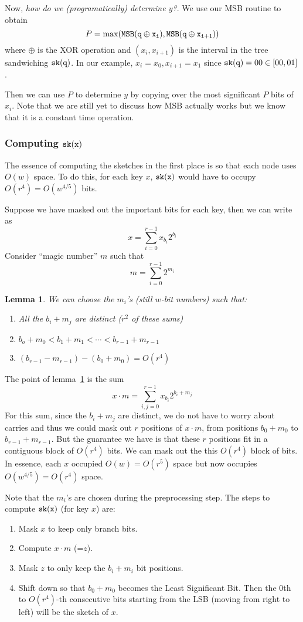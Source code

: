 \documentclass[11pt]{article}
\newcommand{\sk}[1]{{\tt{sk}(#1)}}
\newcommand{\MSB}[1]{{\tt{MSB}(#1)}}
\newtheorem{lemma}[theorem]{Lemma}
\begin{document}
Now, \textit{how do we (programatically) determine $y$?}.
We use our MSB routine to obtain
$$
P = \max(\MSB{q\oplus x_i}, \MSB{q\oplus x_{i+1}})
$$
where $\oplus$ is the XOR operation and $(x_i, x_{i+1})$ is
the interval in the tree sandwiching $\sk{q}$. In our example,
$x_i = x_0, x_{i+1} = x_1$ since $\sk{q} =00\in[00, 01]$.

Then we can use $P$ to determine $y$ by copying over the most
significant $P$ bits of $x_i$. Note that we are still yet to discuss
how MSB actually works but we know that it is a constant time
operation.

\subsubsection{Computing $\sk{x}$}

The essence of computing the sketches in the first place is so that each
node uses $O(w)$ space. To do this, for each key $x$,
$\sk{x}$ would have to occupy $O(r^4) = O(w^{4/5})$ bits.

Suppose we have masked out the important bits for each key, then we can
write as
$$
x = \sum^{r-1}_{i=0}x_{b_i}2^{b_i}
$$
Consider ``magic number'' $m$ such that
$$
m = \sum_{i=0}^{r-1}2^{m_i}
$$

\begin{lemma}
  \label{lemma1}
  We can choose the $m_i$'s (still $w$-bit numbers) such that:
  \begin{enumerate}
  \item
    All the $b_i + m_j$ are distinct ($r^2$ of these sums)
  \item
    $b_o + m_0 < b_1 + m_1 < \cdots < b_{r-1} + m_{r-1}$
  \item
    $(b_{r-1} - m_{r-1}) - (b_0 + m_0) = O(r^4)$
  \end{enumerate}
\end{lemma}

The point of lemma~\ref{lemma1} is the sum
$$
x\cdot m = \sum_{i,j=0}^{r-1}x_{b_i}2^{b_i + m_j}
$$
For this sum, since the $b_i + m_j$ are distinct, we do not have
to worry about carries and thus we could mask out $r$ positions
of $x\cdot m$, from positions
$b_0 + m_0$ to $b_{r-1} + m_{r-1}$. But the
guarantee we have is that these $r$ positions fit in a contiguous
block of $O(r^4)$ bits. We can mask out the this $O(r^4)$ block of
bits. In essence, each $x$ occupied $O(w) = O(r^5)$ space but now
occupies $O(w^{4/5}) = O(r^4)$ space.

Note that the $m_i$'s are chosen during the preprocessing step.
The steps to compute $\sk{x}$ (for key $x$) are:
\begin{enumerate}
\item
  Mask $x$ to keep only branch bits.
\item
  Compute $x\cdot m$ (=$z$).
\item
  Mask $z$ to only keep the $b_i + m_i$ bit positions.
\item
  Shift down so that $b_0 + m_0$ becomes the Least Significant
  Bit. Then the 0th to $O(r^4)$-th consecutive bits starting
  from the LSB (moving from right to left) will be the sketch
  of $x$.
\end{enumerate}
\end{document}
